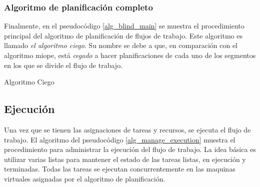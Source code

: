 \subsubsection{Algoritmo de planificación completo}

Finalmente, en el pseudocódigo \ref{alg_blind_main} se muestra el procedimiento principal del algoritmo de planificación de flujos de trabajo. Este algoritmo es llamado \emph{el algoritmo ciego}. Su nombre se debe a que, en comparación con el algoritmo miope, está \emph{cegado} a hacer planificaciones de cada uno de los segmentos en los que se divide el flujo de trabajo.

\begin{algorithm}
\caption{Algoritmo Ciego}
\label{alg_blind_main}
\begin{algorithmic}
	\EndFor
\EndProcedure
\end{algorithmic}
\end{algorithm}


\subsection{Ejecución}

Una vez que se tienen las asignaciones de tareas y recursos, se ejecuta el flujo de trabajo. El algoritmo del pseudoc\'odigo \ref{alg_manage_execution} muestra el procedimiento para administrar la ejecuci\'on del flujo de trabajo. La idea b\'asica es utilizar varias listas para mantener el estado de las tareas listas, en ejecuci\'on y terminadas. Todas las tareas se ejecutan concurrentemente en las m\;aquinas virtuales asignadas por el algoritmo de planificaci\'on.


